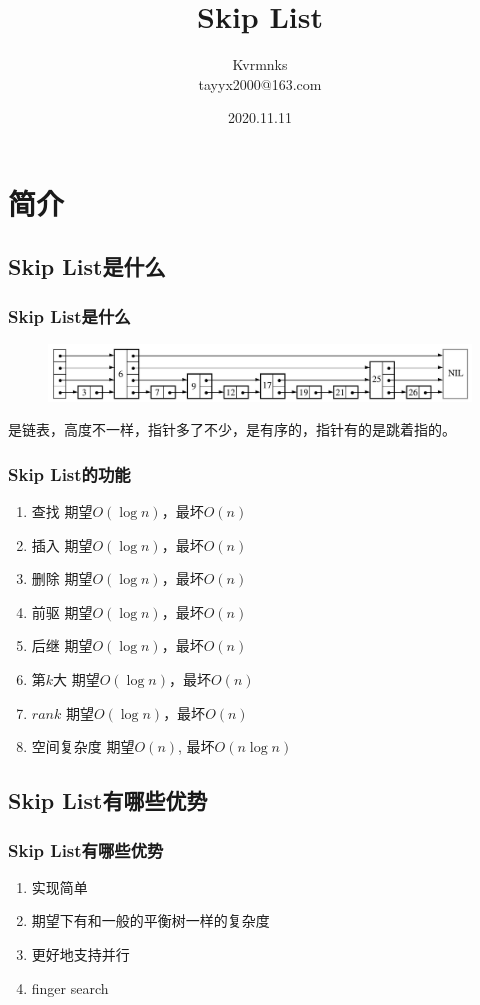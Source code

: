 \documentclass{beamer}
\title{Skip List}
\author[Kvrmnks]{Kvrmnks \\ tayyx2000@163.com}
\date{2020.11.11}
\begin{document}
	\begin{frame}
		\titlepage
	\end{frame}
	\section{简介}
	\subsection{Skip List是什么}

	\begin{frame}
		\frametitle{Skip List是什么}
		\begin{figure}[H]
			\centering
			\includegraphics[scale=0.25]{./img/what_skip_list_is.jpg}
			
		\end{figure}
		是链表，高度不一样，指针多了不少，是有序的，指针有的是跳着指的。
	\end{frame}

	\begin{frame}
		\frametitle{Skip List的功能}
		\begin{enumerate}
			\item 查找 \quad 期望$O(\log n)$，最坏$O(n)$
			\item 插入 \quad 期望$O(\log n)$，最坏$O(n)$
			\item 删除 \quad 期望$O(\log n)$，最坏$O(n)$
			\item 前驱 \quad 期望$O(\log n)$，最坏$O(n)$
			\item 后继 \quad 期望$O(\log n)$，最坏$O(n)$
			\item 第$k$大 \quad 期望$O(\log n)$，最坏$O(n)$
			\item $rank$ \quad 期望$O(\log n)$，最坏$O(n)$
			\item 空间复杂度 \quad 期望$O(n)$, 最坏$O(n\log n)$
		\end{enumerate}
	\end{frame}
	
	\subsection{Skip List有哪些优势}
	\begin{frame}
		\frametitle{Skip List有哪些优势}
		\begin{enumerate}
			\item 实现简单
			\item 期望下有和一般的平衡树一样的复杂度
			\item 更好地支持并行
			\item finger search
		\end{enumerate}
	\end{frame}
\end{document}
